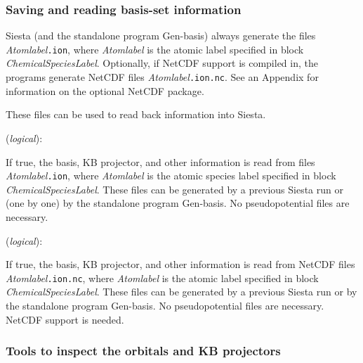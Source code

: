 \documentclass[11pt]{article}
\begin{document}
\subsubsection{Saving and reading basis-set information}

{\sc Siesta} (and the standalone program {\sc Gen-basis}) 
always generate the files
{\it Atomlabel}{\tt .ion}, where {\it Atomlabel} is the atomic label
specified in block {\it ChemicalSpeciesLabel}.  Optionally, if
NetCDF support is compiled in, the programs generate
NetCDF files 
{\it Atomlabel}{\tt .ion.nc}.
See an Appendix for information on the optional NetCDF package.

These files can be used to read back information into {\sc Siesta}.

\begin{description}
\itemsep 10pt
\parsep 0pt
\item[{\bf User.Basis}] ({\it logical}): 

If true, the basis, KB projector, and other information is read from
files {\it Atomlabel}{\tt .ion}, where {\it Atomlabel} is the atomic
species label specified in block {\it ChemicalSpeciesLabel}. These
files can be generated by a previous {\sc Siesta} run or (one by one) by the
standalone program {\sc Gen-basis}. No pseudopotential
files are necessary.

\item[{\bf User.Basis.NetCDF}] ({\it logical}): 

If true, the basis, KB projector, and other information is read from
NetCDF files {\it Atomlabel}{\tt .ion.nc}, where {\it Atomlabel} is
the atomic label specified in block {\it ChemicalSpeciesLabel}. These
files can be generated by a previous {\sc Siesta} run or by the
standalone program {\sc Gen-basis}. No pseudopotential
files are necessary. NetCDF support is needed.

\end{description}

\subsubsection{Tools to inspect the orbitals and KB projectors}
\end{document}
